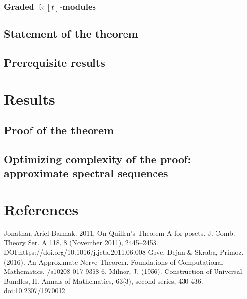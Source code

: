 \documentclass[a4paper, 12pt]{article}
\theoremstyle{definition}
\theoremstyle{remark}
\begin{document}
\subsubsection{Graded $\Bbbk[t]$-modules}

\subsection{Statement of the theorem}

\subsection{Prerequisite results}

\section{Results}

\subsection{Proof of the theorem}

\subsection{Optimizing complexity of the proof: approximate spectral sequences}

\section{References}

\begin{enumerate}
  Jonathan Ariel Barmak. 2011.
  \newblock On Quillen’s Theorem A for posets.
  \newblock J. Comb. Theory Ser. A 118, 8 (November 2011), 2445–2453.
  \newblock DOI:https://doi.org/10.1016/j.jcta.2011.06.008
  Govc, Dejan \& Skraba, Primoz. (2016).
  \newblock An Approximate Nerve Theorem. Foundations of Computational Mathematics.
  /s10208-017-9368-6.
  Milnor, J. (1956).
  \newblock Construction of Universal Bundles, II.
  \newblock Annals of Mathematics, 63(3), second series, 430-436.
  \newblock doi:10.2307/1970012
\end{enumerate}
\end{document}
